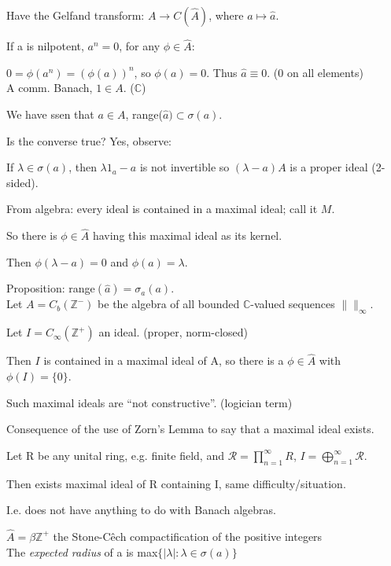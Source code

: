 \documentclass[12pt]{article}
\begin{document}
Have the Gelfand transform: $A \to C(\hat{A})$, where $a \mapsto \hat{a}$.

\noindent
If a is nilpotent, $a^n = 0$, for any $\phi \in \hat{A}$:

$0 = \phi(a^n) = (\phi(a))^n$, so $\phi(a) = 0$.  Thus $\hat{a} \equiv 0$.  (0 on all elements)\\

\noindent
A comm. Banach, $1 \in A$. ($\mathds{C}$)

We have ssen that $a \in A$, range($\hat{a}) \subset \sigma(a)$.

\noindent
Is the converse true? Yes, observe:

If $\lambda \in \sigma(a)$, then $\lambda 1_a - a$ is not invertible so $(\lambda - a)A$ is a proper ideal (2-sided).

From algebra: every ideal is contained in a maximal ideal; call it $M$.

So there is $\phi \in \hat{A}$ having this maximal ideal as its kernel.

Then $\phi(\lambda - a) = 0$ and $\phi(a) = \lambda$.

\noindent
Proposition: range$(\hat{a}) = \sigma_a(a)$.\\

\noindent
Let $A = C_b(\mathds{Z}^-)$ be the algebra of all bounded $\mathds{C}$-valued sequences $\| \|_\infty$.

Let $I = C_\infty(\mathds{Z}^+)$ an ideal. (proper, norm-closed)

Then $I$ is contained in a maximal ideal of A, so there is a $\phi \in \hat{A}$ with $\phi(I) = \{0\}$.

Such maximal ideals are ``not constructive''.  (logician term)

Consequence of the use of Zorn's Lemma to say that a maximal ideal exists.

Let R be any unital ring, e.g. finite field, and $\mathscr{R} = \prod_{n=1}^\infty R$, $I = \bigoplus_{n=1}^\infty \mathscr{R}$.

Then exists maximal ideal of R containing I, same difficulty/situation.

I.e. does not have anything to do with Banach algebras.

$\hat{A} = \beta \mathds{Z}^+$ the Stone-C\^{e}ch compactification of the positive integers\\

\noindent
The \textit{expected radius} of a is max$\{|\lambda|: \lambda \in \sigma(a)\}$
\end{document}
